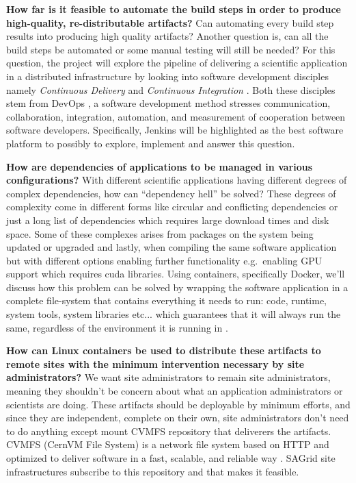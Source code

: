 \documentclass [titlepage,11pt]{article}
\begin{document}
\begin{description}

\item \textbf{How far is it feasible to automate the build steps in order to produce high-quality, re-distributable artifacts?} Can automating every build step results into producing high quality artifacts? Another question is, can all the build steps be automated or some manual testing will still be needed? For this question, the project will explore the pipeline of delivering a scientific application in a distributed infrastructure by looking into software development disciples namely \emph{Continuous Delivery} \cite{delivery15} and \emph{Continuous Integration} \citep{fowler06}. Both these disciples stem from DevOps \citep{wikiOps}, a software development method  stresses communication, collaboration, integration, automation, and measurement of cooperation between software developers. Specifically, Jenkins will be highlighted as the best software platform to possibly to explore, implement and answer this question. \\

\item \textbf{How are dependencies of applications to be managed in various configurations?} With different scientific applications having different degrees of complex dependencies, how can ``dependency hell''\citep{dependency} be solved? These degrees of complexity come in different forms like circular and conflicting dependencies or just a long list of dependencies which requires large download times and disk space. Some of these complexes arises from packages on the system being updated or upgraded and lastly, when compiling the same software application but with different options enabling further functionality e.g.\ enabling GPU support which requires cuda libraries. Using containers, specifically Docker, we'll discuss how this problem can be solved by wrapping the software application in a complete file-system that contains everything it needs to run: code, runtime, system tools, system libraries etc... which guarantees that it will always run the same, regardless of the environment it is running in \citep{dockerWeb}. \\

\item \textbf{How can Linux containers be used to distribute these artifacts to remote sites with the minimum intervention necessary by site administrators?} We want site administrators to remain site administrators, meaning they shouldn't be concern about what an application administrators or scientists are doing. These artifacts should be deployable by minimum efforts, and since they are independent, complete on their own, site administrators don't need to do anything except mount CVMFS repository that deliverers the artifacts. CVMFS (CernVM File System) is a network file system based on HTTP and optimized to deliver software in a fast, scalable, and reliable way \citep{jakob11}. SAGrid site infrastructures subscribe to this repository and that makes it feasible.  \\

\end{description}
\end{document}
